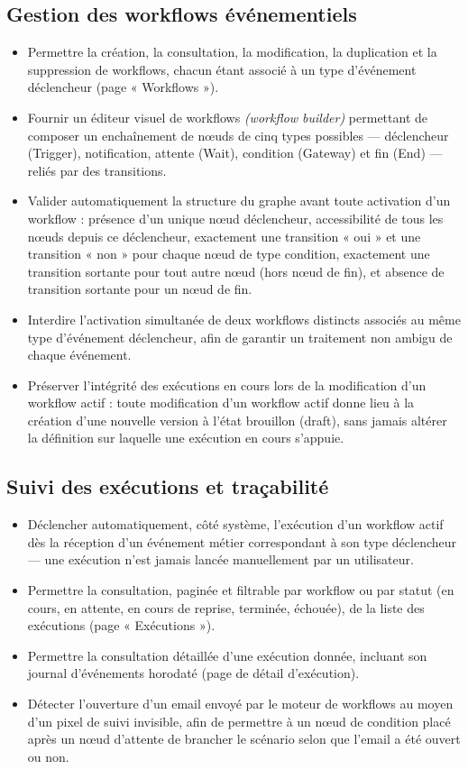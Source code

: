 \documentclass[12pt,a4paper]{report}
\begin{document}
\subsection{Gestion des workflows événementiels}

\begin{itemize}
  \item Permettre la création, la consultation, la modification, la duplication et la suppression de workflows, chacun étant associé à un type d'événement déclencheur (page « Workflows »).
  \item Fournir un éditeur visuel de workflows \textit{(workflow builder)} permettant de composer un enchaînement de n\oe uds de cinq types possibles --- déclencheur (Trigger), notification, attente (Wait), condition (Gateway) et fin (End) --- reliés par des transitions.
  \item Valider automatiquement la structure du graphe avant toute activation d'un workflow : présence d'un unique n\oe ud déclencheur, accessibilité de tous les n\oe uds depuis ce déclencheur, exactement une transition « oui » et une transition « non » pour chaque n\oe ud de type condition, exactement une transition sortante pour tout autre n\oe ud (hors n\oe ud de fin), et absence de transition sortante pour un n\oe ud de fin.
  \item Interdire l'activation simultanée de deux workflows distincts associés au même type d'événement déclencheur, afin de garantir un traitement non ambigu de chaque événement.
  \item Préserver l'intégrité des exécutions en cours lors de la modification d'un workflow actif : toute modification d'un workflow actif donne lieu à la création d'une nouvelle version à l'état brouillon (draft), sans jamais altérer la définition sur laquelle une exécution en cours s'appuie.
\end{itemize}

\subsection{Suivi des exécutions et traçabilité}

\begin{itemize}
  \item Déclencher automatiquement, côté système, l'exécution d'un workflow actif dès la réception d'un événement métier correspondant à son type déclencheur --- une exécution n'est jamais lancée manuellement par un utilisateur.
  \item Permettre la consultation, paginée et filtrable par workflow ou par statut (en cours, en attente, en cours de reprise, terminée, échouée), de la liste des exécutions (page « Exécutions »).
  \item Permettre la consultation détaillée d'une exécution donnée, incluant son journal d'événements horodaté (page de détail d'exécution).
  \item Détecter l'ouverture d'un email envoyé par le moteur de workflows au moyen d'un pixel de suivi invisible, afin de permettre à un n\oe ud de condition placé après un n\oe ud d'attente de brancher le scénario selon que l'email a été ouvert ou non.
\end{itemize}
\end{document}
